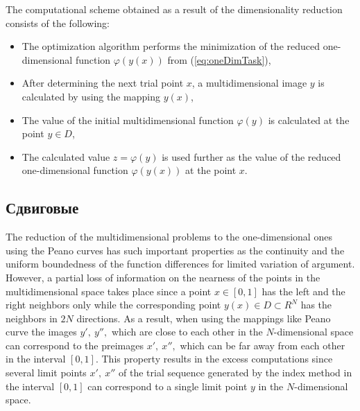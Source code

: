 \documentclass[runningheads]{llncs}
\begin{document}
\par
The computational scheme obtained as a result of the dimensionality reduction consists of the following:
\begin{itemize}
  \item The optimization algorithm performs the minimization of the reduced one-dimensional
  function \(\varphi(y(x))\) from (\ref{eq:oneDimTask}),
  \item After determining the next trial point \(x\), a multidimensional image \(y\) is calculated by using the
mapping \(y(x)\),
  \item The value of the initial multidimensional function \(\varphi(y)\) is calculated at the point \(y\in D\),
  \item The calculated value \(z=\varphi(y)\) is used further as the value of the reduced one-dimensional function \(\varphi(y(x))\) at the point \(x\).
\end{itemize}


\subsection{Сдвиговые}
\label{sec:shifted}

The reduction of the multidimensional problems to the one-dimensional ones using the Peano curves has such important properties as the continuity and the uniform boundedness of the function differences for limited variation of argument. However, a partial loss of information on the nearness of the points in the multidimensional space takes place since a point $x \in [0,1]$ has the left and the right neighbors only while the corresponding point $y(x) \in D \subset R^N$ has the neighbors in $2N$ directions. As a result, when using the mappings like Peano curve the images $y',\ y'',$ which are close to each other in the $N$-dimensional space can correspond to the preimages $x',\ x'',$ which can be far away from each other in the interval $[0,1]$. This property results in the excess computations since several limit points $x',\ x''$ of the trial sequence generated by the index method in the interval $[0,1]$ can correspond to a single limit point $y$ in the $N$-dimensional space.
\end{document}
